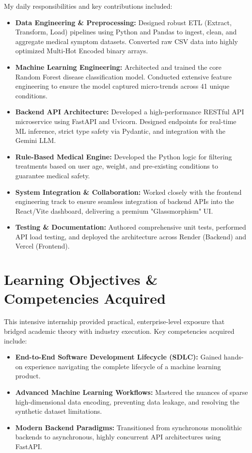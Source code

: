 \documentclass[12pt,a4paper]{report}
\begin{document}
My daily responsibilities and key contributions included:
\begin{itemize}
    \item \textbf{Data Engineering \& Preprocessing:} Designed robust ETL (Extract, Transform, Load) pipelines using Python and Pandas to ingest, clean, and aggregate medical symptom datasets. Converted raw CSV data into highly optimized Multi-Hot Encoded binary arrays.
    \item \textbf{Machine Learning Engineering:} Architected and trained the core Random Forest disease classification model. Conducted extensive feature engineering to ensure the model captured micro-trends across 41 unique conditions.
    \item \textbf{Backend API Architecture:} Developed a high-performance RESTful API microservice using FastAPI and Uvicorn. Designed endpoints for real-time ML inference, strict type safety via Pydantic, and integration with the Gemini LLM.
    \item \textbf{Rule-Based Medical Engine:} Developed the Python logic for filtering treatments based on user age, weight, and pre-existing conditions to guarantee medical safety.
    \item \textbf{System Integration \& Collaboration:} Worked closely with the frontend engineering track to ensure seamless integration of backend APIs into the React/Vite dashboard, delivering a premium "Glassmorphism" UI.
    \item \textbf{Testing \& Documentation:} Authored comprehensive unit tests, performed API load testing, and deployed the architecture across Render (Backend) and Vercel (Frontend).
\end{itemize}

\section{Learning Objectives \& Competencies Acquired}
This intensive internship provided practical, enterprise-level exposure that bridged academic theory with industry execution. Key competencies acquired include:
\begin{itemize}
    \item \textbf{End-to-End Software Development Lifecycle (SDLC):} Gained hands-on experience navigating the complete lifecycle of a machine learning product.
    \item \textbf{Advanced Machine Learning Workflows:} Mastered the nuances of sparse high-dimensional data encoding, preventing data leakage, and resolving the synthetic dataset limitations.
    \item \textbf{Modern Backend Paradigms:} Transitioned from synchronous monolithic backends to asynchronous, highly concurrent API architectures using FastAPI.
\end{itemize}
\end{document}

